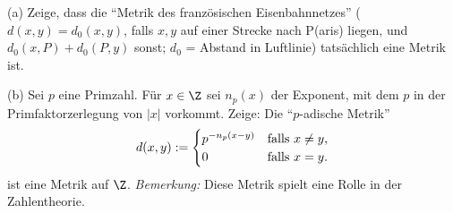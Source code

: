 \begin{prob}

(a) Zeige, dass die ``Metrik des franz\"osischen Eisenbahnnetzes''
($d(x,y)=d_0(x,y)$, falls $x,y$ auf einer Strecke nach P(aris) liegen,
und $d_0(x,P)+d_0(P,y)$ sonst; $d_0$ = Abstand in Luftlinie)
tats\"achlich eine Metrik ist. 

(b) Sei $p$ eine Primzahl. F\"ur $x\in\Z$ sei $n_p(x)$ der Exponent,
mit dem $p$ in der Primfaktorzerlegung von $|x|$ vorkommt. Zeige: Die
``$p$-adische Metrik'' 
$$
   d(x,y):=\begin{cases} p^{-n_p(x-y)} & \text{falls $x\neq y$,}\cr 0
   & \text{falls $x=y$.} \end{cases}
$$
ist eine Metrik auf $\Z$. {\it Bemerkung: }
  Diese Metrik spielt eine Rolle in der Zahlentheorie. 
\end{prob}
